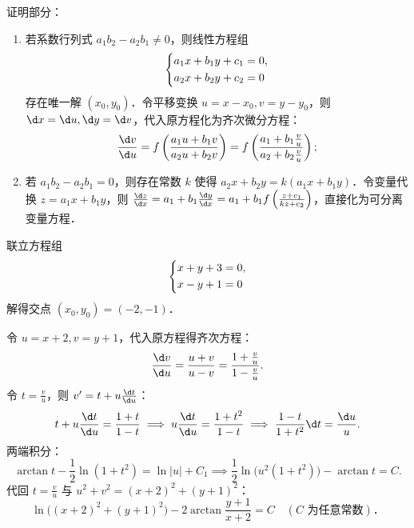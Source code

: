 \begin{solution}
    证明部分：
    \begin{enumerate}
        \item 若系数行列式 $a_1 b_2 - a_2 b_1 \neq 0$，则线性方程组
              \begin{equation}
                  \begin{dcases}
                      a_1 x + b_1 y + c_1 = 0, \\
                      a_2 x + b_2 y + c_2 = 0
                  \end{dcases}
              \end{equation}
              存在唯一解 $(x_0, y_0)$．令平移变换 $u = x - x_0, v = y - y_0$，则 $\d x = \d u, \d y = \d v$，代入原方程化为齐次微分方程：
              \begin{equation}
                  \frac{\d v}{\d u} = f\left(\frac{a_1 u + b_1 v}{a_2 u + b_2 v}\right) = f\left(\frac{a_1 + b_1 \frac{v}{u}}{a_2 + b_2 \frac{v}{u}}\right);
              \end{equation}
        \item 若 $a_1 b_2 - a_2 b_1 = 0$，则存在常数 $k$ 使得 $a_2 x + b_2 y = k(a_1 x + b_1 y)$．令变量代换 $z = a_1 x + b_1 y$，则 $\frac{\d z}{\d x} = a_1 + b_1 \frac{\d y}{\d x} = a_1 + b_1 f\left(\frac{z + c_1}{k z + c_2}\right)$，直接化为可分离变量方程．
    \end{enumerate}


    联立方程组
    \begin{equation}
        \begin{dcases}
            x + y + 3 = 0, \\
            x - y + 1 = 0
        \end{dcases}
    \end{equation}
    解得交点 $(x_0, y_0) = (-2, -1)$．

    令 $u = x + 2, v = y + 1$，代入原方程得齐次方程：
    \begin{equation}
        \frac{\d v}{\d u} = \frac{u + v}{u - v} = \frac{1 + \frac{v}{u}}{1 - \frac{v}{u}}.
    \end{equation}
    令 $t = \frac{v}{u}$，则 $v' = t + u \frac{\d t}{\d u}$：
    \begin{equation}
        t + u \frac{\d t}{\d u} = \frac{1 + t}{1 - t} \implies u \frac{\d t}{\d u} = \frac{1 + t^2}{1 - t} \implies \frac{1 - t}{1 + t^2}\d t = \frac{\d u}{u}.
    \end{equation}
    两端积分：
    \begin{equation}
        \arctan t - \frac{1}{2}\ln(1 + t^2) = \ln|u| + C_1 \implies \frac{1}{2}\ln\bigl(u^2(1 + t^2)\bigr) - \arctan t = C.
    \end{equation}
    代回 $t = \frac{v}{u}$ 与 $u^2 + v^2 = (x+2)^2 + (y+1)^2$：
    \begin{equation}
        \boxed{\ln\bigl((x+2)^2 + (y+1)^2\bigr) - 2\arctan\frac{y+1}{x+2} = C \quad (C \text{ 为任意常数})．}
    \end{equation}


\end{solution}
